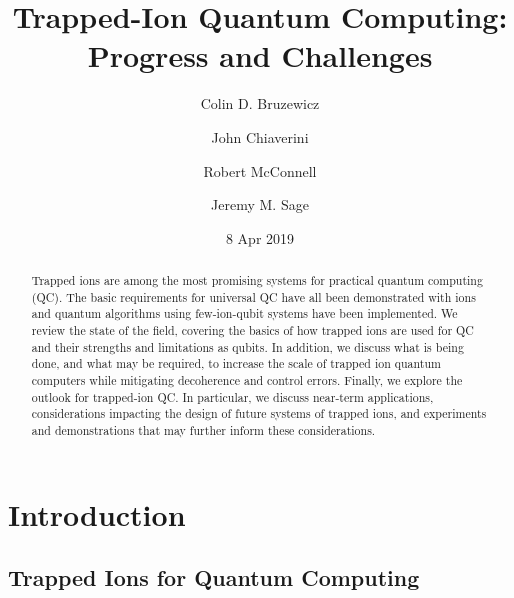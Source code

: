 \documentclass[%
12pt,
 amsmath,amssymb,
]{revtex4-2}
\begin{document}


\date{8 Apr 2019}
\title{Trapped-Ion Quantum Computing: Progress and Challenges}
\author{Colin D. Bruzewicz}
\author{John Chiaverini}
\author{Robert McConnell}
\author{Jeremy M. Sage}


\begin{abstract}
Trapped ions are among the most promising systems for practical quantum computing (QC).  The basic requirements for universal QC have all been demonstrated with ions and quantum algorithms using few-ion-qubit systems have been implemented.  We review the state of the field, covering the basics of how trapped ions are used for QC and their strengths and limitations as qubits.  In addition, we discuss what is being done, and what may be required, to increase the scale of trapped ion quantum computers while mitigating decoherence and control errors.  Finally, we explore the outlook for trapped-ion QC.  In particular, we discuss near-term applications, considerations impacting the design of future systems of trapped ions, and experiments and demonstrations that may further inform these considerations.

\end{abstract}


\maketitle
\tableofcontents
\section{Introduction}
\subsection{Trapped Ions for Quantum Computing}
\end{document}
